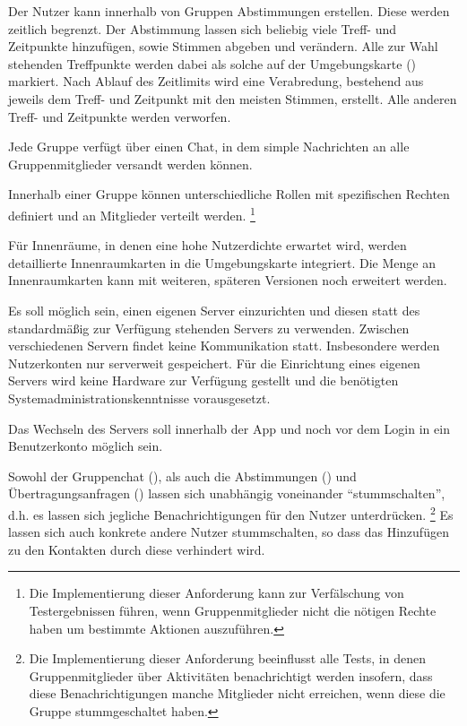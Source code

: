 \documentclass[parskip=full,11pt]{scrartcl}
\begin{document}
%
Der Nutzer kann innerhalb von Gruppen Abstimmungen erstellen.
Diese werden zeitlich begrenzt.
Der Abstimmung lassen sich beliebig viele Treff- und Zeitpunkte hinzufügen,
sowie Stimmen abgeben und verändern.
Alle zur Wahl stehenden Treffpunkte werden dabei als solche auf der
Umgebungskarte () markiert.
Nach Ablauf des Zeitlimits wird eine Verabredung, bestehend aus jeweils dem
Treff- und Zeitpunkt mit den meisten Stimmen, erstellt.
Alle anderen Treff- und Zeitpunkte werden verworfen.

%
Jede Gruppe verfügt über einen Chat, in dem simple Nachrichten an alle
Gruppenmitglieder versandt werden können.

Innerhalb einer Gruppe können unterschiedliche Rollen
mit spezifischen Rechten definiert und an Mitglieder verteilt werden.
\footnote{Die Implementierung dieser Anforderung kann zur Verfälschung von
Testergebnissen führen, wenn Gruppenmitglieder nicht die nötigen Rechte haben
um bestimmte Aktionen auszuführen.}

%
Für Innenräume, in denen eine hohe Nutzerdichte erwartet wird, werden
detaillierte Innenraumkarten in die Umgebungskarte integriert. Die Menge an
Innenraumkarten kann mit weiteren, späteren Versionen noch erweitert werden.

%
Es soll möglich sein, einen eigenen Server einzurichten und diesen statt des
standardmäßig zur Verfügung stehenden Servers zu verwenden.
Zwischen verschiedenen Servern findet keine Kommunikation statt.
Insbesondere werden Nutzerkonten nur serverweit gespeichert.
Für die Einrichtung eines eigenen Servers wird keine Hardware zur Verfügung
gestellt und die benötigten Systemadministrationskenntnisse vorausgesetzt.

%
Das Wechseln des Servers soll innerhalb der App und noch vor dem Login in ein
Benutzerkonto möglich sein.

%
Sowohl der Gruppenchat (), als auch die
Abstimmungen () und Übertragungsanfragen
() lassen sich unabhängig voneinander
\enquote{stummschalten}, d.h. es lassen sich jegliche Benachrichtigungen für den
Nutzer unterdrücken.
\footnote{Die Implementierung dieser Anforderung beeinflusst alle Tests, in denen
	Gruppenmitglieder über Aktivitäten benachrichtigt werden insofern, dass diese Benachrichtigungen
	manche Mitglieder nicht erreichen, wenn diese die Gruppe stummgeschaltet haben.}
Es lassen sich auch konkrete andere Nutzer stummschalten, so dass das
Hinzufügen zu den Kontakten durch diese verhindert wird.
\end{document}
